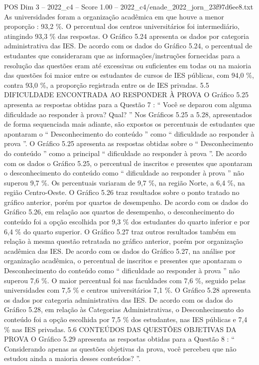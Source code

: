 \begin{textsample}{POS Dim 3 – 2022\_c4 – Score 1.00 – 2022\_c4/enade\_2022\_jorn\_23f97d6ee8.txt}
As universidades foram a organização acadêmica em que houve a menor proporção : 93,2 \%.
O percentual dos centros universitários foi intermediário, atingindo 93,3 \% das respostas.
O Gráfico 5.24 apresenta os dados por categoria administrativa das IES.
De acordo com os dados do Gráfico 5.24, o percentual de estudantes que consideraram que as informações/instruções fornecidas para a resolução das questões eram até excessivas ou suficientes em todas ou na maioria das questões foi maior entre os estudantes de cursos de IES públicas, com 94,0 \%, contra 93,0 \%, a proporção registrada entre os de IES privadas. 5.5 DIFICULDADE ENCONTRADA AO RESPONDER À PROVA O Gráfico 5.25 apresenta as respostas obtidas para a Questão 7 : “ Você se deparou com alguma dificuldade ao responder à prova?
Qual? ” Nos Gráficos 5.25 a 5.28, apresentados de forma sequenciada mais adiante, são expostos os percentuais de estudantes que apontaram o “ Desconhecimento do conteúdo ” como “ dificuldade ao responder à prova ”.
O Gráfico 5.25 apresenta as respostas obtidas sobre o “ Desconhecimento do conteúdo ” como a principal “ dificuldade ao responder à prova ”.
De acordo com os dados o Gráfico 5.25, o percentual de inscritos e presentes que apontaram o desconhecimento do conteúdo como “ dificuldade ao responder à prova ” não superou 9,7 \%.
Os percentuais variaram de 9,7 \%, na região Norte, a 6,4 \%, na região Centro-Oeste.
O Gráfico 5.26 traz resultados sobre o ponto tratado no gráfico anterior, porém por quartos de desempenho.
De acordo com os dados do Gráfico 5.26, em relação aos quartos de desempenho, o desconhecimento do conteúdo foi a opção escolhida por 9,3 \% dos estudantes do quarto inferior e por 6,4 \% do quarto superior.
O Gráfico 5.27 traz outros resultados também em relação à mesma questão retratada no gráfico anterior, porém por organização acadêmica das IES.
De acordo com os dados do Gráfico 5.27, na análise por organização acadêmica, o percentual de inscritos e presentes que apontaram o Desconhecimento do conteúdo como “ dificuldade ao responder à prova ” não superou 7,6 \%.
O maior percentual foi nas faculdades com 7,6 \%, seguido pelas universidades com 7,5 \% e centros universitários 7,1 \%.
O Gráfico 5.28 apresenta os dados por categoria administrativa das IES.
De acordo com os dados do Gráfico 5.28, em relação às Categorias Administrativas, o Desconhecimento do conteúdo foi a opção escolhida por 7,5 \% dos estudantes, nas IES públicas e 7,4 \% nas IES privadas. 5.6 CONTEÚDOS DAS QUESTÕES OBJETIVAS DA PROVA O Gráfico 5.29 apresenta as respostas obtidas para a Questão 8 : “ Considerando apenas as questões objetivas da prova, você percebeu que não estudou ainda a maioria desses conteúdos? ”.

\end{textsample}
